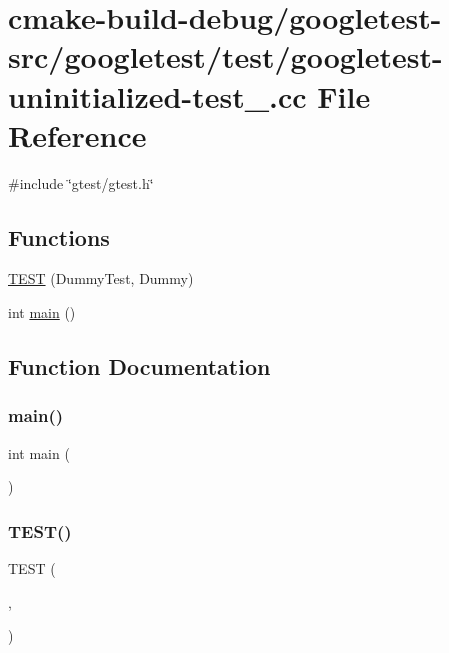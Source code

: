 \hypertarget{googletest-uninitialized-test___8cc}{}\section{cmake-\/build-\/debug/googletest-\/src/googletest/test/googletest-\/uninitialized-\/test\+\_\+.cc File Reference}
\label{googletest-uninitialized-test___8cc}
{\ttfamily \#include \char`\"{}gtest/gtest.\+h\char`\"{}}\newline
\subsection*{Functions}
\begin{DoxyCompactItemize}
\item 
\mbox{\hyperlink{googletest-uninitialized-test___8cc_a63812c9ef0cbc6907a251ccf919da78e}{T\+E\+ST}} (Dummy\+Test, Dummy)
\item 
int \mbox{\hyperlink{googletest-uninitialized-test___8cc_ae66f6b31b5ad750f1fe042a706a4e3d4}{main}} ()
\end{DoxyCompactItemize}


\subsection{Function Documentation}
\mbox{\label{googletest-uninitialized-test___8cc_ae66f6b31b5ad750f1fe042a706a4e3d4}} 
\subsubsection{\texorpdfstring{main()}{main()}}
{\footnotesize\ttfamily int main (\begin{DoxyParamCaption}{ }\end{DoxyParamCaption})}

\mbox{\label{googletest-uninitialized-test___8cc_a63812c9ef0cbc6907a251ccf919da78e}} 
\subsubsection{\texorpdfstring{TEST()}{TEST()}}
{\footnotesize\ttfamily T\+E\+ST (\begin{DoxyParamCaption}\item[{Dummy\+Test}]{,  }\item[{Dummy}]{ }\end{DoxyParamCaption})}

